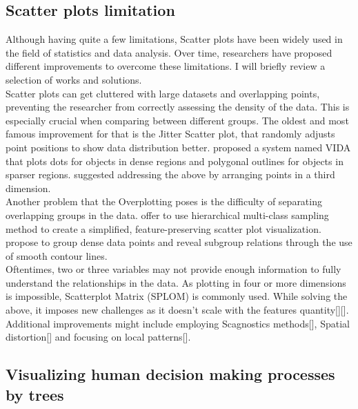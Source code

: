 \documentclass[11pt]{article}
\begin{document}
\subsection{Scatter plots limitation}\label{Scatter plots limitation}
Although having quite a few limitations, Scatter plots have been widely used in the field of statistics and data analysis. Over time, researchers have proposed different improvements to overcome these limitations. I will briefly review a selection of works and solutions.\\
Scatter plots can get cluttered with large datasets and overlapping points, preventing the researcher from correctly assessing the density of the data. This is especially crucial when comparing between different groups. The oldest and most famous improvement for that is the Jitter Scatter plot, that randomly adjusts point positions to show data distribution better. \cite{woodruff1998constant} proposed a system named VIDA that plots dots for objects in dense regions and polygonal outlines for objects in sparser regions. \cite{dang2010stacking} suggested addressing the above by arranging points in a third dimension.\\
Another problem that the Overplotting poses is the difficulty of separating overlapping groups in the data. \cite{lee2012ieee} offer to use hierarchical multi-class sampling method to create a simplified, feature-preserving scatter plot visualization. \cite{mayorga2013splatterplots} propose to group dense data points and reveal subgroup relations through the use of smooth contour lines.\\
Oftentimes, two or three variables may not provide enough information to fully understand the relationships in the data. As plotting in four or more dimensions is impossible, Scatterplot Matrix (SPLOM) is commonly used. While solving the above, it imposes new challenges as it doesn’t scale with the features quantity[][].\\
Additional improvements might include employing Scagnostics methods[], Spatial distortion[] and focusing on local patterns[].

\subsection{Visualizing human decision making processes by trees
}\label{Visualizing human decision making processes by trees}
\end{document}
